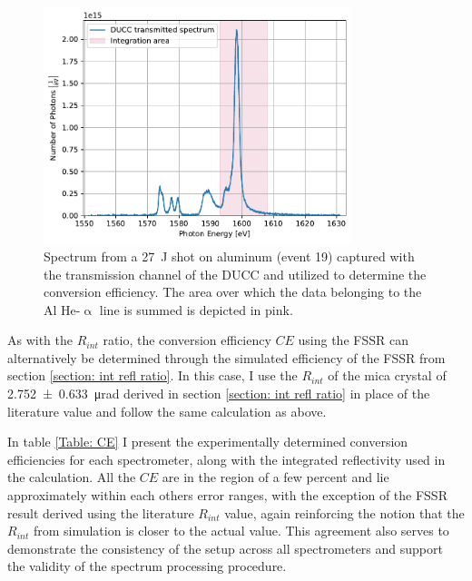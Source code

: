 \begin{figure}[H]
	\centering
	\includegraphics[width=0.8\textwidth]{Data_Analysis/converison_efficiency/spectra_of_Al_event_19_on_DUCC_transmitted_spectrum.pdf}
	\caption{Spectrum from a \SI{27}{\joule} shot on aluminum (event 19) captured with the transmission channel of the DUCC and utilized to determine the conversion efficiency. The area over which the data belonging to the Al He-$\upalpha$ line is summed is depicted in pink.}
	\label{fig: CE DUCC_t}
\end{figure}

As with the $R_{int}$ ratio, the conversion efficiency $CE$ using the FSSR can alternatively be determined through the simulated efficiency of the FSSR from section \ref{section: int refl ratio}. In this case, I use the $R_{int}$ of the mica crystal of \SI{2.752\pm0.633}{\micro\radian} derived in section \ref{section: int refl ratio} in place of the literature value and follow the same calculation as above.

In table \ref{Table: CE} I present the experimentally determined conversion efficiencies for each spectrometer, along with the integrated reflectivity used in the calculation. All the $CE$ are in the region of a few percent and lie approximately within each others error ranges, with the exception of the FSSR result derived using the literature $R_{int}$ value, again reinforcing the notion that the $R_{int}$ from simulation is closer to the actual value. This agreement also serves to demonstrate the consistency of the setup across all spectrometers and support the validity of the spectrum processing procedure.

